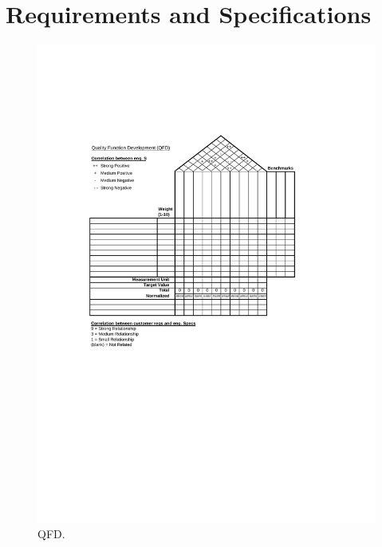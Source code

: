 
\let\clearpage\relax
\chapter{Requirements and Specifications}

\blindtext

\begin{figure}[!htp]
    \centering
    \includegraphics[scale=1]{figs/qfd.pdf}
    \caption{QFD.}
    \label{fig:qfd}
\end{figure}